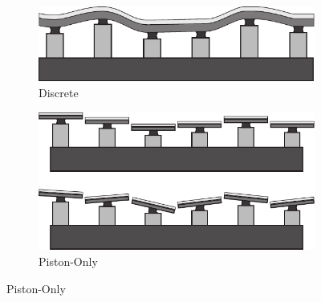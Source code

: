 \begin{figure}[tbh]
			\centering
			\begin{subfigure}[b]{0.25\textwidth}
							\includegraphics[width=\textwidth]{images/deformable_discrete}
							\caption{Discrete}
							\label{fig:Correctors_discrete}
			\end{subfigure}
			\quad
			\begin{subfigure}[b]{0.25\textwidth}
							\includegraphics[width=\textwidth]{images/deformable_piston}
							\caption{Piston-Only}
							\label{fig:Correctors_piston}
			\end{subfigure}
			
			\vspace{5mm}
			

\end{figure}
